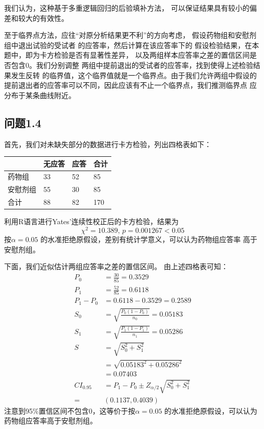 \documentclass{article}
\begin{document}
我们认为，这种基于多重逻辑回归的后验填补方法，
可以保证结果具有较小的偏差和较大的有效性。

至于临界点方法，应往“对原分析结果更不利”的方向考虑，
假设药物组和安慰剂组中退出试验的受试者
的应答率，然后计算在该应答率下的
假设检验结果，在本题中，即为卡方检验是否有显著性差异，
以及两组样本应答率之差的置信区间是否包含0。我们分别调整
两组中提前退出的受试者的应答率，找到使得上述检验结果发生反转
的临界值，这个临界值就是一个临界点。由于我们允许两组中假设的
提前退出者的应答率可以不同，因此应该有不止一个临界点，我们推测临界点
应分布于某条曲线附近。
\subsection{问题1.4}
首先，我们对未缺失部分的数据进行卡方检验，列出四格表如下：
\begin{table}[H]
    \centering
    \begin{tabular}{llll}
        \hline
         & 无应答 & 应答 & 合计  \\
         \hline
    药物组  & 33   & 52   & 85  \\
    安慰剂组 & 55   & 30   & 85  \\
    \hline
    合计   & 88   & 82   & 170\\
    \hline
    \end{tabular}
    \end{table}
利用R语言进行Yates'连续性校正后的卡方检验，结果为
\[\chi^2=10.389,\,p=0.001267<0.05\] 按$\alpha=0.05$
的水准拒绝原假设，差别有统计学意义，可以认为药物组应答率
高于安慰剂组。

下面，我们近似估计两组应答率之差的置信区间。
由上述四格表可知：
\begin{align*}
    P_0 &= \frac{30}{85} = 0.3529 \\
    P_1 &= \frac{52}{85} = 0.6118 \\
    P_1-P_0 &= 0.6118-0.3529=0.2589\\
    S_0 & = \sqrt{\frac{P_0(1-P_0)}{n_0}} = 0.05183\\
    S_1 & = \sqrt{\frac{P_1(1-P_1)}{n_1}} =  0.05286\\
    S &= \sqrt{ S_0^2 + S_1^2}\\
      &= \sqrt{0.05183^2 + 0.05286^2} \\
      &=0.07403\\
    CI_{0.95} &= P_1-P_0 \pm Z_{\alpha/2}\sqrt{ S_0^2 + S_1^2}\\
    =& (0.1137, 0.4039)
\end{align*}
注意到95$\%$置信区间不包含0，这等价于按$\alpha=0.05$
的水准拒绝原假设，可以认为药物组应答率高于安慰剂组。
\end{document}

